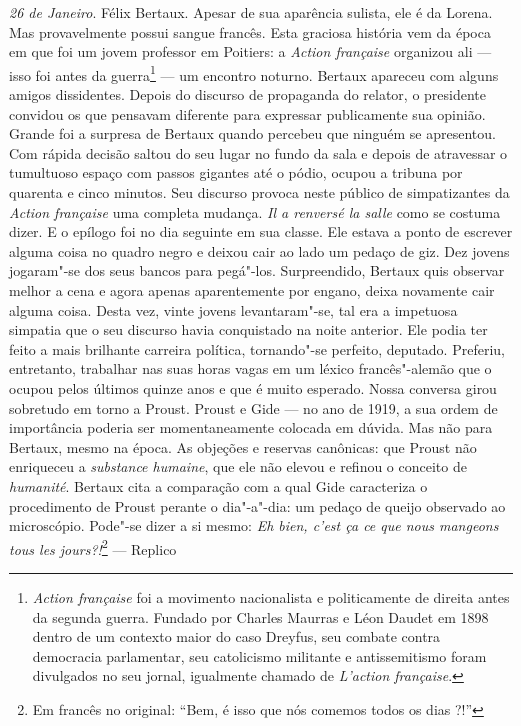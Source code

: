 \emph{26 de Janeiro}. Félix Bertaux. Apesar de sua aparência sulista,
ele é da Lorena. Mas provavelmente possui sangue francês. Esta graciosa
história vem da época em que foi um jovem professor em Poitiers: a
\emph{Action française} organizou ali --- isso foi antes da
guerra\footnote{\emph{Action française} foi a movimento
  nacionalista e politicamente de direita antes da segunda guerra.
  Fundado por Charles Maurras e Léon Daudet em 1898 dentro de um
  contexto maior do caso Dreyfus, seu combate contra democracia
  parlamentar, seu catolicismo militante e antissemitismo foram
  divulgados no seu jornal, igualmente chamado de \emph{L'action
  française}. \versal{[N. E.]}} --- um encontro noturno. Bertaux apareceu com alguns
amigos dissidentes. Depois do discurso de propaganda do relator, o
presidente convidou os que pensavam diferente para expressar
publicamente sua opinião. Grande foi a surpresa de Bertaux quando
percebeu que ninguém se apresentou. Com rápida decisão saltou do seu
lugar no fundo da sala e depois de atravessar o tumultuoso espaço com
passos gigantes até o pódio, ocupou a tribuna por quarenta e cinco
minutos. Seu discurso provoca neste público de simpatizantes da
\emph{Action française} uma completa mudança. \emph{Il a renversé la
salle} como se costuma dizer. E o epílogo foi no dia seguinte em sua
classe. Ele estava a ponto de escrever alguma coisa no quadro negro e
deixou cair ao lado um pedaço de giz. Dez jovens jogaram"-se dos seus
bancos para pegá"-los. Surpreendido, Bertaux quis observar melhor a cena
e agora apenas aparentemente por engano, deixa novamente cair alguma
coisa. Desta vez, vinte jovens levantaram"-se, tal era a impetuosa
simpatia que o seu discurso havia conquistado na noite anterior. Ele
podia ter feito a mais brilhante carreira política, tornando"-se
perfeito, deputado. Preferiu, entretanto, trabalhar nas suas horas vagas
em um léxico francês"-alemão que o ocupou pelos últimos quinze anos e que
é muito esperado. Nossa conversa girou sobretudo em torno a Proust.
Proust e Gide --- no ano de 1919, a sua ordem de importância poderia ser
momentaneamente colocada em dúvida. Mas não para Bertaux, mesmo na
época. As objeções e reservas canônicas: que Proust não enriqueceu a
\emph{substance humaine}, que ele não elevou e refinou o conceito de
\emph{humanité}. Bertaux cita a comparação com a qual Gide caracteriza o
procedimento de Proust perante o dia"-a"-dia: um pedaço de queijo
observado ao microscópio. Pode"-se dizer a si mesmo: \emph{Eh bien, c'est
ça ce que nous mangeons tous les jours?!}\footnote{Em francês no original: ``Bem, é isso
  que nós comemos todos os dias ?!'' \versal{[N. T.]}} --- Replico
